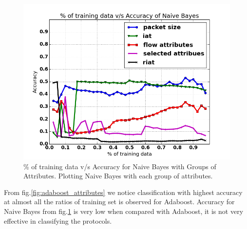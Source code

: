 \documentclass[conference]{IEEEtran}
\begin{document}
\begin{figure}[!t]
	\centering
	\includegraphics[width=1\columnwidth]{naive_bayes_all_attr_plot.png}
	\caption{\% of training data v/s Accuracy for Naive Bayes with Groups of Attributes. Plotting Naive Bayes with each group of attributes.}
	\label{fig:naive_attributes}
\end{figure}
From fig.\ref{fig:adaboost_attributes} we notice classification with highest accuracy at almost all the ratios of training set is observed for Adaboost. Accuracy for Naive Bayes\cite{} from fig.\ref{fig:naive_attributes} is very low when compared with Adaboost, it is not very effective in classifying the protocols.
\end{document}
